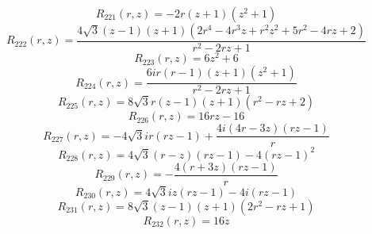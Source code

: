 \documentclass[11pt,a4paper]{article}
\begin{document}
\begin{equation}
R_{221}(r,z)=- 2 r \left(z + 1\right) \left(z^{2} + 1\right)
\label{eq:cat-rational-221}
\end{equation}
\begin{equation}
R_{222}(r,z)=\frac{4 \sqrt{3} \left(z - 1\right) \left(z + 1\right) \left(2 r^{4} - 4 r^{3} z + r^{2} z^{2} + 5 r^{2} - 4 r z + 2\right)}{r^{2} - 2 r z + 1}
\label{eq:cat-rational-222}
\end{equation}
\begin{equation}
R_{223}(r,z)=6 z^{2} + 6
\label{eq:cat-rational-223}
\end{equation}
\begin{equation}
R_{224}(r,z)=\frac{6 i r \left(r - 1\right) \left(z + 1\right) \left(z^{2} + 1\right)}{r^{2} - 2 r z + 1}
\label{eq:cat-rational-224}
\end{equation}
\begin{equation}
R_{225}(r,z)=8 \sqrt{3} r \left(z - 1\right) \left(z + 1\right) \left(r^{2} - r z + 2\right)
\label{eq:cat-rational-225}
\end{equation}
\begin{equation}
R_{226}(r,z)=16 r z - 16
\label{eq:cat-rational-226}
\end{equation}
\begin{equation}
R_{227}(r,z)=- 4 \sqrt{3} i r \left(r z - 1\right) + \frac{4 i \left(4 r - 3 z\right) \left(r z - 1\right)}{r}
\label{eq:cat-rational-227}
\end{equation}
\begin{equation}
R_{228}(r,z)=4 \sqrt{3} \left(r - z\right) \left(r z - 1\right) - 4 \left(r z - 1\right)^{2}
\label{eq:cat-rational-228}
\end{equation}
\begin{equation}
R_{229}(r,z)=- \frac{4 \left(r + 3 z\right) \left(r z - 1\right)}{r}
\label{eq:cat-rational-229}
\end{equation}
\begin{equation}
R_{230}(r,z)=4 \sqrt{3} i z \left(r z - 1\right) - 4 i \left(r z - 1\right)
\label{eq:cat-rational-230}
\end{equation}
\begin{equation}
R_{231}(r,z)=8 \sqrt{3} \left(z - 1\right) \left(z + 1\right) \left(2 r^{2} - r z + 1\right)
\label{eq:cat-rational-231}
\end{equation}
\begin{equation}
R_{232}(r,z)=16 z
\label{eq:cat-rational-232}
\end{equation}
\end{document}
